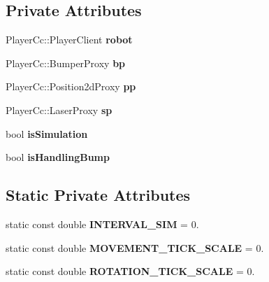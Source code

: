 \subsection*{Private Attributes}
\begin{DoxyCompactItemize}
\item 
\mbox{\label{classRobot_ac3903c0fa2e632a3fc62b359ed1f12f2}} 
Player\+Cc\+::\+Player\+Client {\bfseries robot}
\item 
\mbox{\label{classRobot_a32ed999d2284b95c3596c6f073419332}} 
Player\+Cc\+::\+Bumper\+Proxy {\bfseries bp}
\item 
\mbox{\label{classRobot_a1a1e0da135cca4e2b18b6f7d6fa23c37}} 
Player\+Cc\+::\+Position2d\+Proxy {\bfseries pp}
\item 
\mbox{\label{classRobot_a1d5b77e3c4b66aa68c3f73b79fcf9e5c}} 
Player\+Cc\+::\+Laser\+Proxy {\bfseries sp}
\item 
\mbox{\label{classRobot_ab88f32a555401802c4022603cc59b056}} 
bool {\bfseries is\+Simulation}
\item 
\mbox{\label{classRobot_a9c01fc0ef1c08e887f9665b108a890c8}} 
bool {\bfseries is\+Handling\+Bump}
\end{DoxyCompactItemize}
\subsection*{Static Private Attributes}
\begin{DoxyCompactItemize}
\item 
\mbox{\label{classRobot_add5396ff4e6823edca84c9f764018c52}} 
static const double {\bfseries I\+N\+T\+E\+R\+V\+A\+L\+\_\+\+S\+IM} = 0.
\item 
\mbox{\label{classRobot_aa8edfc239fbc5a45c59f5bd509a68118}} 
static const double {\bfseries M\+O\+V\+E\+M\+E\+N\+T\+\_\+\+T\+I\+C\+K\+\_\+\+S\+C\+A\+LE} = 0.
\item 
\mbox{\label{classRobot_a51f83c88ba8eb30ce636e1c363185481}} 
static const double {\bfseries R\+O\+T\+A\+T\+I\+O\+N\+\_\+\+T\+I\+C\+K\+\_\+\+S\+C\+A\+LE} = 0.
\end{DoxyCompactItemize}


